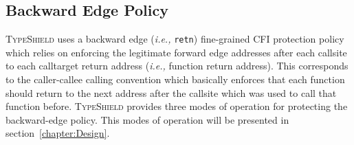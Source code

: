 \subsection{Backward Edge Policy}
\label{Backward Edge CFI Policy}
\textsc{TypeShield} uses a backward edge (\textit{i.e.,} \texttt{retn}) fine-grained CFI protection policy which 
relies on enforcing the legitimate forward edge addresses after each callsite
to each calltarget return address (\textit{i.e.,} function return address). 
This corresponds to the caller-callee calling convention 
which basically enforces that each function should return to the next address after the callsite which 
was used to call that function before. \textsc{TypeShield} provides three modes of operation for
protecting the backward-edge policy. This modes of operation will be presented in section~\cref{chapter:Design}.

